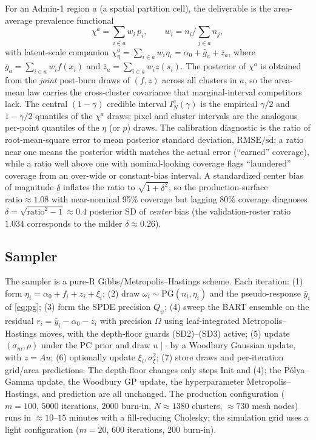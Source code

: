 \documentclass[11pt]{article}
\theoremstyle{remark}
\newcommand{\PG}{\mathrm{PG}}
\newcommand{\chia}{\chi^a}
\newcommand{\ratio}{\mathrm{RMSE}/\overline{\mathrm{sd}}}
\begin{document}
For an Admin-1 region $a$ (a spatial partition cell), the deliverable is the
area-average prevalence functional
\begin{equation}\label{eq:chia}
\chia = \sum_{i\in a} w_i\, p_i, \qquad w_i = n_i \Big/ \sum_{j\in a} n_j ,
\end{equation}
with latent-scale companion $\chia_\eta = \sum_{i\in a} w_i \eta_i = \alpha_0 +
\bar g_a + \bar z_a$, where $\bar g_a=\sum_{i\in a} w_i f(x_i)$ and $\bar
z_a=\sum_{i\in a} w_i z(s_i)$. The posterior of $\chia$ is obtained from the
\emph{joint} post-burn draws of $(f,z)$ across all clusters in $a$, so the area-mean
law carries the cross-cluster covariance that marginal-interval competitors lack.
The central $(1-\gamma)$ credible interval $I^a_N(\gamma)$ is the empirical
$\gamma/2$ and $1-\gamma/2$ quantiles of the $\chia$ draws; pixel and cluster
intervals are the analogous per-point quantiles of the $\eta$ (or $p$) draws.
The calibration diagnostic is the ratio of root-mean-square error to mean
posterior standard deviation, $\ratio$; a ratio near one means the posterior
width matches the actual error (``earned'' coverage), while a ratio well above one
with nominal-looking coverage flags ``laundered'' coverage from an
over-wide or constant-bias interval. A standardized center bias of magnitude
$\delta$ inflates the ratio to $\sqrt{1+\delta^2}$, so the production-surface
$\mathrm{ratio}\approx1.08$ with near-nominal 95\% coverage but lagging 80\%
coverage diagnoses $\delta=\sqrt{\mathrm{ratio}^2-1}\approx0.4$ posterior SD of
\emph{center} bias (the validation-roster ratio $1.034$ corresponds to the
milder $\delta\approx0.26$).

\subsection{Sampler}\label{sec:sampler}

The sampler is a pure-R Gibbs/Metropolis--Hastings scheme. Each iteration:
(1) form $\eta_i=\alpha_0+f_i+z_i+\xi_i$; (2) draw $\omega_i\sim\PG(n_i,\eta_i)$
and the pseudo-response $\bar y_i$ of \eqref{eq:pg}; (3) form the SPDE precision
$Q_\psi$; (4) sweep the BART ensemble on the residual $r_i=\bar y_i-\alpha_0-z_i$
with precision $\Omega$ using leaf-integrated Metropolis--Hastings moves, with the
depth-floor guards (SD2)--(SD3) active; (5) update $(\sigma_m,\rho)$ under the PC
prior and draw $u\mid\cdot$ by a Woodbury Gaussian update, with $z=Au$;
(6) optionally update $\xi_i,\sigma^2_\xi$; (7) store draws and per-iteration
grid/area predictions. The depth-floor changes only steps Init and (4); the
P\'olya--Gamma update, the Woodbury GP update, the hyperparameter
Metropolis--Hastings, and prediction are all unchanged. The production
configuration ($m=100$, $5000$ iterations, $2000$ burn-in, $N\approx 1380$
clusters, $\approx 730$ mesh nodes) runs in $\approx 10$--$15$ minutes with a
fill-reducing Cholesky; the simulation grid uses a light configuration ($m=20$,
$600$ iterations, $200$ burn-in).
\end{document}
